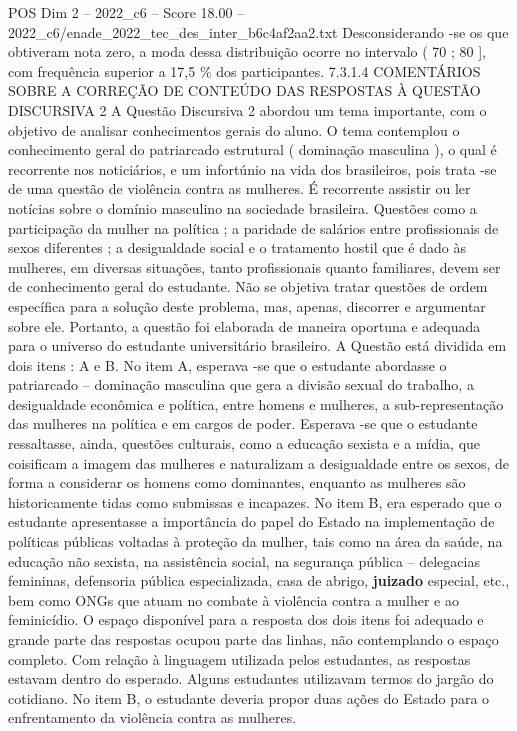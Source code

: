 \begin{textsample}{POS Dim 2 – 2022\_c6 – Score 18.00 – 2022\_c6/enade\_2022\_tec\_des\_inter\_b6c4af2aa2.txt}
Desconsiderando -se os que obtiveram nota zero, a moda dessa distribuição ocorre no intervalo ( 70 ; 80 ], com frequência superior a 17,5 \% dos participantes. 7.3.1.4 COMENTÁRIOS SOBRE A CORREÇÃO DE CONTEÚDO DAS RESPOSTAS À QUESTÃO DISCURSIVA 2 A Questão Discursiva 2 abordou um tema importante, com o objetivo de analisar conhecimentos gerais do aluno.
O tema contemplou o conhecimento geral do patriarcado estrutural ( dominação masculina ), o qual é recorrente nos noticiários, e um infortúnio na vida dos brasileiros, pois trata -se de uma questão de violência contra as mulheres.
É recorrente assistir ou ler notícias sobre o domínio masculino na sociedade brasileira.
Questões como a participação da mulher na política ; a paridade de salários entre profissionais de sexos diferentes ; a desigualdade social e o tratamento hostil que é dado às mulheres, em diversas situações, tanto profissionais quanto familiares, devem ser de conhecimento geral do estudante.
Não se objetiva tratar questões de ordem específica para a solução deste problema, mas, apenas, discorrer e argumentar sobre ele.
Portanto, a questão foi elaborada de maneira oportuna e adequada para o universo do estudante universitário brasileiro.
A Questão está dividida em dois itens : A e B.
No item A, esperava -se que o estudante abordasse o patriarcado – dominação masculina que gera a divisão sexual do trabalho, a desigualdade econômica e política, entre homens e mulheres, a sub-representação das mulheres na política e em cargos de poder.
Esperava -se que o estudante ressaltasse, ainda, questões culturais, como a educação sexista e a mídia, que coisificam a imagem das mulheres e naturalizam a desigualdade entre os sexos, de forma a considerar os homens como dominantes, enquanto as mulheres são historicamente tidas como submissas e incapazes.
No item B, era esperado que o estudante apresentasse a importância do papel do Estado na implementação de políticas públicas voltadas à proteção da mulher, tais como na área da saúde, na educação não sexista, na assistência social, na segurança pública – delegacias femininas, defensoria pública especializada, casa de abrigo, \textbf{juizado} especial, etc., bem como ONGs que atuam no combate à violência contra a mulher e ao feminicídio.
O espaço disponível para a resposta dos dois itens foi adequado e grande parte das respostas ocupou parte das linhas, não contemplando o espaço completo.
Com relação à linguagem utilizada pelos estudantes, as respostas estavam dentro do esperado.
Alguns estudantes utilizavam termos do jargão do cotidiano.
No item B, o estudante deveria propor duas ações do Estado para o enfrentamento da violência contra as mulheres.

\end{textsample}
